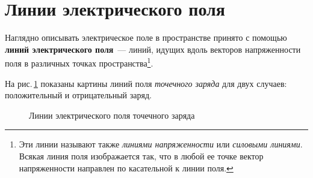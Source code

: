 \documentclass[main.tex]{subfiles}
\begin{document}

 

 

 
   

\section{Линии электрического поля}


Наглядно описывать электрическое поле в пространстве принято с помощью \textbf{линий электрического поля}~--- линий, идущих вдоль векторов напряженности поля в различных точках пространства\footnote{Эти линии называют также \emph{линиями напряженности} или \emph{силовыми линиями}. Всякая линия поля изображается так, что в любой ее точке вектор напряженности направлен по касательной к линии поля.}.

На рис.\,\ref{fig:p99} показаны картины линий поля \emph{точечного заряда} для двух случаев: положительный и отрицательный заряд.

    \begin{figure}[H]
    \centering

\caption{Линии электрического поля точечного заряда}
\label{fig:p99}
\end{figure}
\end{document}
